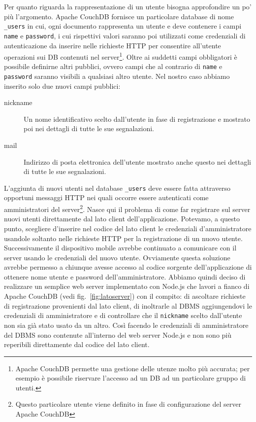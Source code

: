         \noindent Per quanto riguarda la rappresentazione di un utente bisogna approfondire
        un po' più l'argomento. Apache CouchDB\texttrademark{} fornisce un
        particolare database di nome \verb|_users| in cui, ogni documento
        rappresenta un utente e deve contenere i campi \texttt{name} e \texttt{password}, i cui
        rispettivi valori saranno poi utilizzati come credenziali di
        autenticazione da inserire nelle richieste HTTP per consentire
        all'utente operazioni sui DB contenuti nel server\footnote{
        Apache CouchDB\texttrademark{} permette una gestione delle utenze molto
        più accurata; per esempio è possibile riservare l'accesso ad un DB ad un
        particolare gruppo di utenti.}. Oltre ai suddetti campi obbligatori è
        possibile definirne altri pubblici, ovvero campi che al contrario di
        \texttt{name} e \texttt{password} saranno visibili a qualsiasi altro utente.
        Nel nostro caso abbiamo inserito solo due nuovi campi pubblici:
        \begin{description}
            \item[nickname] Un nome identificativo scelto dall'utente in fase di
                registrazione e mostrato poi nei dettagli di tutte le sue segnalazioni.
            \item[mail] Indirizzo di posta elettronica dell'utente mostrato anche questo
                nei dettagli di tutte le sue segnalazioni.
        \end{description}

        \noindent L'aggiunta di nuovi utenti nel database \verb|_users| deve essere fatta
        attraverso opportuni messaggi HTTP nei quali occorre essere autenticati
        come amministratori del server\footnote{Questo particolare utente viene
        definito in fase di configurazione del server Apache CouchDB\texttrademark{}}.
        Nasce qui il problema di come far registrare sul server nuovi utenti
        direttamente dal lato client dell'applicazione. Potevamo, a questo punto,
        scegliere d'inserire nel codice del lato client le credenziali
        d'amministratore usandole soltanto nelle richieste HTTP per la registrazione
        di un nuovo utente. Successivamente il dispositivo mobile avrebbe continuato a
        comunicare con il server usando le credenziali del nuovo utente. Ovviamente
        questa soluzione avrebbe permesso a chiunque avesse accesso al codice
        sorgente dell'applicazione di ottenere nome utente e password dell'amministratore.
        Abbiamo quindi deciso di realizzare un semplice web server implementato
        con Node.js che lavori a fianco di Apache CouchDB\texttrademark{}
        (vedi fig.~\ref{fig:latoserver}) con il
        compito: di ascoltare richieste di registrazione provenienti dal lato
        client, di inoltrarle al DBMS aggiungendovi le credenziali di amministratore
        e di controllare che il \texttt{nickname} scelto dall'utente non sia già
        stato usato da un altro. Così facendo le credenziali di amministratore
        del DBMS sono contenute all'interno del web server Node.js e non sono più
        reperibili direttamente dal codice del lato client.

